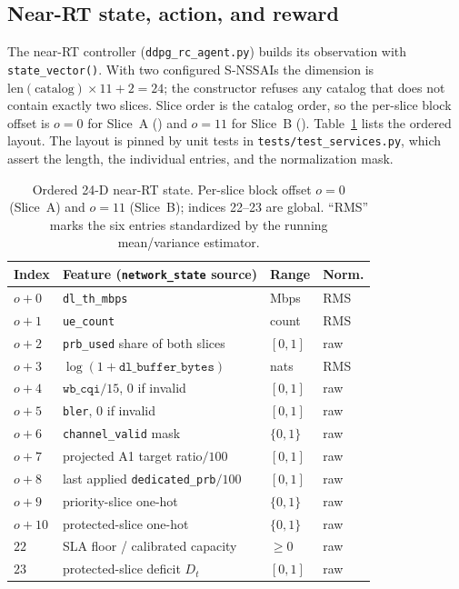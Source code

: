 \subsection{Near-RT state, action, and reward}
\label{subsec:ctl-state}
The near-RT controller (\texttt{ddpg\_rc\_agent.py}) builds its observation with \texttt{state\_vector()}. With two configured S-NSSAIs the dimension is $\mathrm{len}(\text{catalog})\times11+2=24$; the constructor refuses any catalog that does not contain exactly two slices. Slice order is the catalog order, so the per-slice block offset is $o=0$ for Slice~A (\snssaiA) and $o=11$ for Slice~B (\snssaiB). Table~\ref{tab:ctl-state} lists the ordered layout. The layout is pinned by unit tests in \texttt{tests/test\_services.py}, which assert the length, the individual entries, and the normalization mask.

\begin{table}[t]
\centering
\footnotesize
\caption{Ordered 24-D near-RT state. Per-slice block offset $o=0$ (Slice~A) and $o=11$ (Slice~B); indices 22--23 are global. ``RMS'' marks the six entries standardized by the running mean/variance estimator.}
\label{tab:ctl-state}
\begin{tabular}{llll}
\toprule
Index & Feature (\texttt{network\_state} source) & Range & Norm.\\
\midrule
$o{+}0$ & \texttt{dl\_th\_mbps} & Mbps & RMS\\
$o{+}1$ & \texttt{ue\_count} & count & RMS\\
$o{+}2$ & \texttt{prb\_used} share of both slices & $[0,1]$ & raw\\
$o{+}3$ & $\log(1+\texttt{dl\_buffer\_bytes})$ & nats & RMS\\
$o{+}4$ & $\texttt{wb\_cqi}/15$, $0$ if invalid & $[0,1]$ & raw\\
$o{+}5$ & \texttt{bler}, $0$ if invalid & $[0,1]$ & raw\\
$o{+}6$ & \texttt{channel\_valid} mask & $\{0,1\}$ & raw\\
$o{+}7$ & projected A1 target ratio${}/100$ & $[0,1]$ & raw\\
$o{+}8$ & last applied \texttt{dedicated\_prb}${}/100$ & $[0,1]$ & raw\\
$o{+}9$ & priority-slice one-hot & $\{0,1\}$ & raw\\
$o{+}10$ & protected-slice one-hot & $\{0,1\}$ & raw\\
\midrule
$22$ & SLA floor / calibrated capacity & $\geq0$ & raw\\
$23$ & protected-slice deficit $D_t$ & $[0,1]$ & raw\\
\bottomrule
\end{tabular}
\end{table}


